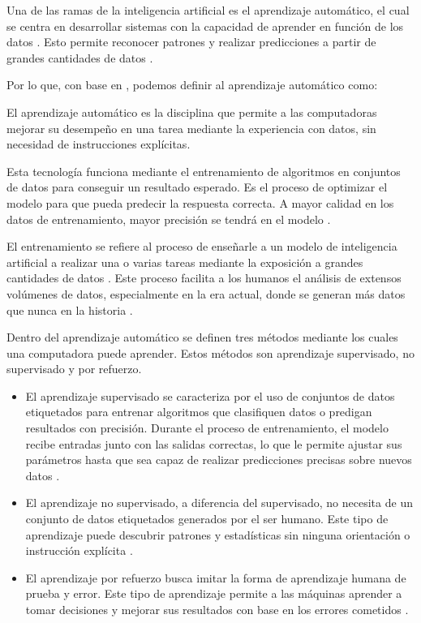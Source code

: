 Una de las ramas de la inteligencia artificial es el aprendizaje automático, el cual se centra en desarrollar sistemas con la capacidad de aprender en función de los datos \cite{oracle2025_ml}. Esto permite reconocer patrones y realizar predicciones a partir de grandes cantidades de datos \cite{google_ml}.

Por lo que, con base en \cite{oracle2025_ml, ibm_ml}, podemos definir al aprendizaje automático como:

\begin{definition}
	El aprendizaje automático es la disciplina que permite a las computadoras mejorar su desempeño en una tarea mediante la experiencia con datos, sin necesidad de instrucciones explícitas.
\end{definition}

Esta tecnología funciona mediante el entrenamiento de algoritmos en conjuntos de datos para conseguir un resultado esperado. Es el proceso de optimizar el modelo para que pueda predecir la respuesta correcta. A mayor calidad en los datos de entrenamiento, mayor precisión se tendrá en el modelo \cite{google_ml}.

El entrenamiento se refiere al proceso de enseñarle a un modelo de inteligencia artificial a realizar una o varias tareas mediante la exposición a grandes cantidades de datos \cite{main2023_training}. Este proceso facilita a los humanos el análisis de extensos volúmenes de datos, especialmente en la era actual, donde se generan más datos que nunca en la historia \cite{oracle2024_big_data}.

Dentro del aprendizaje automático se definen tres métodos mediante los cuales una computadora puede aprender. Estos métodos son aprendizaje supervisado, no supervisado y por refuerzo.

\begin{itemize}
	\item El aprendizaje supervisado se caracteriza por el uso de conjuntos de datos etiquetados para entrenar algoritmos que clasifiquen datos o predigan resultados con precisión. Durante el proceso de entrenamiento, el modelo recibe entradas junto con las salidas correctas, lo que le permite ajustar sus parámetros hasta que sea capaz de realizar predicciones precisas sobre nuevos datos \cite{ibm_ml}. 
	
	\item El aprendizaje no supervisado, a diferencia del supervisado, no necesita de un conjunto de datos etiquetados generados por el ser humano. Este tipo de aprendizaje puede descubrir patrones y estadísticas sin ninguna orientación o instrucción explícita \cite{google_u_ml}. 
	
	\item El aprendizaje por refuerzo busca imitar la forma de aprendizaje humana de prueba y error. Este tipo de aprendizaje permite a las máquinas aprender a tomar decisiones y mejorar sus resultados con base en los errores cometidos \cite{aws_r_ml}.
	
\end{itemize}

